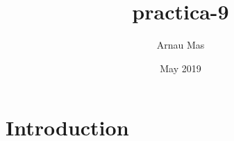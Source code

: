 \documentclass{article}
\title{practica-9}
\author{Arnau Mas}
\date{May 2019}
\begin{document}
\maketitle

\section{Introduction}
\end{document}
